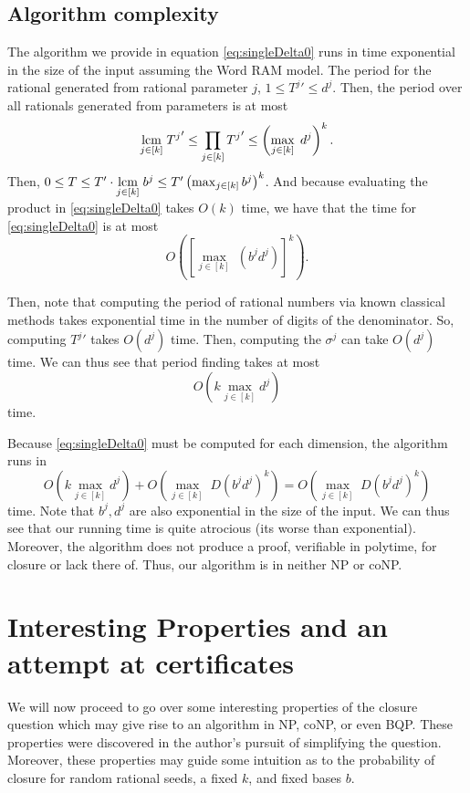 \documentclass[11pt,titlepage]{article}
\newcommand{\rationalPeriod}{{T^j}'}
\newcommand{\rationalPeriodTotal}{{T}'}
\newcommand{\totalPeriod}{T}
\newcommand{\digSumPeriodic}{\sigma^j}
\begin{document}
\subsection{Algorithm complexity}
The algorithm we provide in equation \eqref{eq:singleDelta0} runs in time exponential 
in the size of the input assuming the Word RAM model. 
The period for the rational generated from rational parameter $j$, $1 \leq \rationalPeriod \leq d^j$. Then,
the period over all rationals generated from parameters is at most 
$$
  \lcm{j \in [k]} \rationalPeriod \leq \prod_{j \in [k]} \rationalPeriod \leq \left(\max_{j \in [k]} \; d^j \right)^k.
$$
Then, 
$0 \leq \totalPeriod \leq \rationalPeriodTotal \cdot \lcm{j \in [k]} b^j \leq \rationalPeriodTotal \left(\max_{j \in [k]} b^j\right)^k$.
And because evaluating the product in \eqref{eq:singleDelta0} takes $O(k)$ time,
we have that the time for \eqref{eq:singleDelta0} is at most
$$
  O\left(\left[\max_{j \in [k]} \; (b^j d^j)\right]^k \right).
$$

Then, note that computing the period of rational numbers via known classical methods takes 
exponential time in the number of digits of the denominator. So, computing
$\rationalPeriod$ takes $O(d^j)$ time. Then, computing the $\digSumPeriodic$
can take $O(d^j)$ time. 
We can thus see that period finding takes at most
$$
O\left(k \max_{j \in [k]} d^j \right)
$$
time.

Because \eqref{eq:singleDelta0} must be computed for each dimension, the algorithm
runs in 
$$
  O\left(k \max_{j \in [k]} d^j \right) + 
  O\left(\max_{j \in [k]} \; D (b^j d^j)^k \right) = 
  O\left(\max_{j \in [k]} \; D (b^j d^j)^k \right)
$$
time.
Note that $b^j, d^j$ are also exponential in the size of the input. 
We can thus see that our running time is quite atrocious (its worse than exponential).
Moreover, the algorithm does not produce a proof, verifiable in polytime, for closure 
or lack there of. Thus, our algorithm is in neither NP or coNP.

\section{Interesting Properties and an attempt at certificates}
We will now proceed to go over some interesting properties of the closure question
which may give rise to an algorithm in NP, coNP, or even BQP. These properties were discovered
in the author's pursuit of simplifying the question. Moreover, these properties may guide
some intuition as to the probability of closure for random rational seeds, a fixed $k$, 
and fixed bases $b$.
\end{document}
